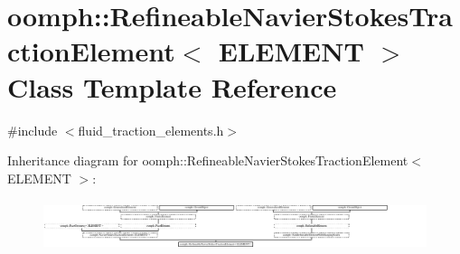 \hypertarget{classoomph_1_1RefineableNavierStokesTractionElement}{}\section{oomph\+:\+:Refineable\+Navier\+Stokes\+Traction\+Element$<$ E\+L\+E\+M\+E\+NT $>$ Class Template Reference}
\label{classoomph_1_1RefineableNavierStokesTractionElement}


{\ttfamily \#include $<$fluid\+\_\+traction\+\_\+elements.\+h$>$}

Inheritance diagram for oomph\+:\+:Refineable\+Navier\+Stokes\+Traction\+Element$<$ E\+L\+E\+M\+E\+NT $>$\+:\begin{figure}[H]
\begin{center}
\leavevmode
\includegraphics[height=1.513513cm]{classoomph_1_1RefineableNavierStokesTractionElement}
\end{center}
\end{figure}

